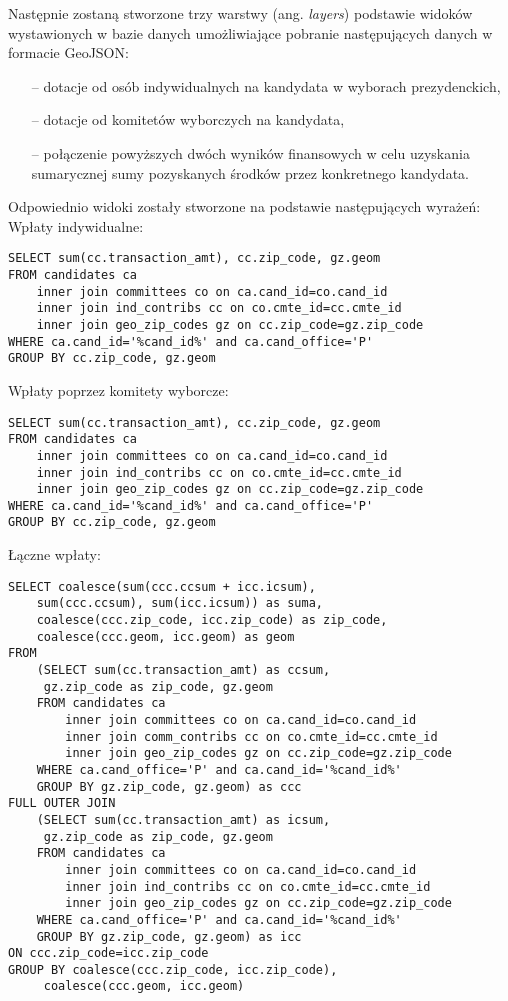 \documentclass[10pt,a4paper]{article}
\begin{document}
Następnie zostaną stworzone trzy warstwy (ang. \textit{layers}) podstawie widoków wystawionych w bazie danych umożliwiające pobranie następujących danych w formacie GeoJSON:
\begin{itemize}
\item[--] dotacje od osób indywidualnych na kandydata w wyborach prezydenckich,
\item[--] dotacje od komitetów wyborczych na kandydata,
\item[--] połączenie powyższych dwóch wyników finansowych w celu uzyskania sumarycznej sumy pozyskanych środków przez konkretnego kandydata.
\end{itemize}

Odpowiednio widoki zostały stworzone na podstawie następujących wyrażeń:
\bigskip \noindent
Wpłaty indywidualne:
\begin{lstlisting}[style=BashInputStyle]
SELECT sum(cc.transaction_amt), cc.zip_code, gz.geom
FROM candidates ca
	inner join committees co on ca.cand_id=co.cand_id
	inner join ind_contribs cc on co.cmte_id=cc.cmte_id
	inner join geo_zip_codes gz on cc.zip_code=gz.zip_code 
WHERE ca.cand_id='%cand_id%' and ca.cand_office='P'
GROUP BY cc.zip_code, gz.geom
\end{lstlisting}
\bigskip \noindent
Wpłaty poprzez komitety wyborcze:
\begin{lstlisting}[style=BashInputStyle]
SELECT sum(cc.transaction_amt), cc.zip_code, gz.geom
FROM candidates ca
	inner join committees co on ca.cand_id=co.cand_id
	inner join ind_contribs cc on co.cmte_id=cc.cmte_id
	inner join geo_zip_codes gz on cc.zip_code=gz.zip_code 
WHERE ca.cand_id='%cand_id%' and ca.cand_office='P'
GROUP BY cc.zip_code, gz.geom
\end{lstlisting}
\bigskip \noindent
Łączne wpłaty:
\begin{lstlisting}[style=BashInputStyle]
SELECT coalesce(sum(ccc.ccsum + icc.icsum), 
	sum(ccc.ccsum), sum(icc.icsum)) as suma, 
	coalesce(ccc.zip_code, icc.zip_code) as zip_code, 
	coalesce(ccc.geom, icc.geom) as geom 
FROM
	(SELECT sum(cc.transaction_amt) as ccsum,
	 gz.zip_code as zip_code, gz.geom
	FROM candidates ca
		inner join committees co on ca.cand_id=co.cand_id
		inner join comm_contribs cc on co.cmte_id=cc.cmte_id
		inner join geo_zip_codes gz on cc.zip_code=gz.zip_code 
	WHERE ca.cand_office='P' and ca.cand_id='%cand_id%' 
	GROUP BY gz.zip_code, gz.geom) as ccc
FULL OUTER JOIN
	(SELECT sum(cc.transaction_amt) as icsum,
	 gz.zip_code as zip_code, gz.geom
	FROM candidates ca
		inner join committees co on ca.cand_id=co.cand_id
		inner join ind_contribs cc on co.cmte_id=cc.cmte_id
		inner join geo_zip_codes gz on cc.zip_code=gz.zip_code 
	WHERE ca.cand_office='P' and ca.cand_id='%cand_id%' 
	GROUP BY gz.zip_code, gz.geom) as icc
ON ccc.zip_code=icc.zip_code
GROUP BY coalesce(ccc.zip_code, icc.zip_code),
	 coalesce(ccc.geom, icc.geom)
\end{lstlisting}
\end{document}
